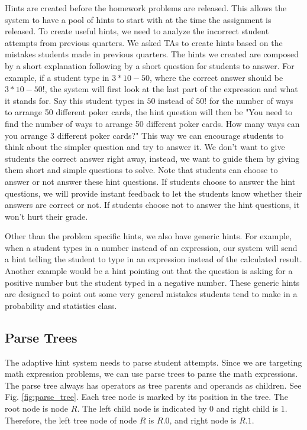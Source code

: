 \documentclass{llncs}
\begin{document}
Hints are created before the homework problems are released. This allows the system to have a pool of hints to start with at the time the assignment is released. To create useful hints, we need to analyze the incorrect student attempts from previous quarters. We asked TAs to create hints based on the mistakes students made in previous quarters. The hints we created are composed by a short explanation following by a short question for students to answer. For example, if a student type in $3*10-50$, where the correct answer should be $3*10-50!$, the system will first look at the last part of the expression and what it stands for. Say this student types in $50$ instead of $50!$ for the number of ways to arrange 50 different poker cards, the hint question will then be "You need to find the number of ways to arrange 50 different poker cards. How many ways can you arrange 3 different poker cards?" This way we can encourage students to think about the simpler question and try to answer it. We don't want to give students the correct answer right away, instead, we want to guide them by giving them short and simple questions to solve. Note that students can choose to answer or not answer these hint questions. If students choose to answer the hint questions, we will provide instant feedback to let the students know whether their answers are correct or not. If students choose not to answer the hint questions, it won't hurt their grade.

Other than the problem specific hints, we also have generic hints. For example, when a student types in a number instead of an expression, our system will send a hint telling the student to type in an expression instead of the calculated result. Another example would be a hint pointing out that the question is asking for a positive number but the student typed in a negative number. These generic hints are designed to point out some very general mistakes students tend to make in a probability and statistics class.


\subsection*{Parse Trees}
The adaptive hint system needs to parse student attempts. Since we are targeting math expression problems, we can use parse trees to parse the math expressions. The parse tree always has operators as tree parents and operands as children. See Fig. \ref{fig:parse_tree}. Each tree node is marked by its position in the tree. The root node is node $R$. The left child node is indicated by $0$ and right child is $1$. Therefore, the left tree node of node $R$ is $R.0$, and right node is $R.1$. 
\end{document}
